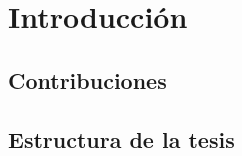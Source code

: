 \chapter{Introducción}

\lipsum 
{}

\section{Contribuciones}

\lipsum

\section{Estructura de la tesis}

\lipsum
